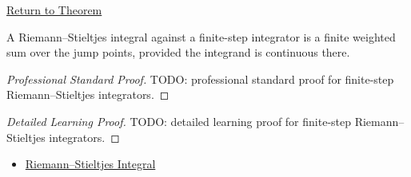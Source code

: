 \newpage
{}
\label{prf:rs-step-integrator-finite-sum}

\begin{remark*}[Return]
\hyperref[thm:rs-step-integrator-finite-sum]{Return to Theorem}
\end{remark*}

\begin{theorem*}
A Riemann--Stieltjes integral against a finite-step integrator is a finite
weighted sum over the jump points, provided the integrand is continuous there.
\end{theorem*}

\begin{proof}[Professional Standard Proof]
\LRAProofBodyStart
TODO: professional standard proof for finite-step Riemann--Stieltjes integrators.
\end{proof}

\begin{proof}[Detailed Learning Proof]
\LRAProofBodyStart
TODO: detailed learning proof for finite-step Riemann--Stieltjes integrators.
\end{proof}

\begin{remark*}
\end{remark*}

\begin{dependencies}
\begin{itemize}
  \item \hyperref[def:riemann-stieltjes-integral]{Riemann--Stieltjes Integral}
\end{itemize}
\end{dependencies}

\clearpage
